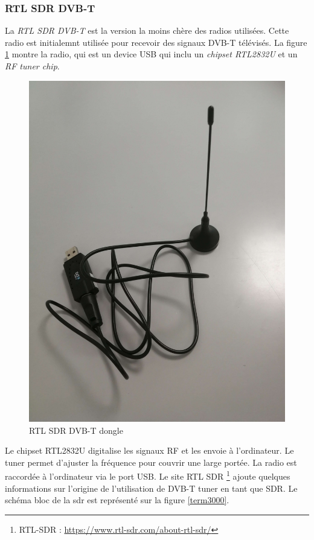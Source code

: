 \newpage

\subsubsection{RTL SDR DVB-T}\label{dvbt}

La \textit{RTL SDR DVB-T} est la version la moins chère des radios utilisées. Cette radio est initialemnt utilisée pour recevoir des signaux \ac{DVB-T} télévisés. La figure \ref{term31} montre la radio, qui est un device \ac{USB} qui inclu un \textit{chipset RTL2832U} et un \textit{RF tuner chip}.

\begin{figure}[h]
\centering

\includegraphics[scale=0.08]{images/dvbt.png}
\caption{RTL SDR DVB-T dongle}\label{term31}
\end{figure}

Le chipset RTL2832U digitalise les signaux RF et les envoie à l'ordinateur. Le tuner permet d'ajuster la fréquence pour couvrir une large portée.
La radio est raccordée à l'ordinateur via le port \ac{USB}. Le site RTL SDR \footnote{RTL-SDR : \href{https://www.rtl-sdr.com/about-rtl-sdr/}{https://www.rtl-sdr.com/about-rtl-sdr/}} ajoute quelques informations sur l'origine de l'utilisation de \ac{DVB-T} tuner en tant que \ac{SDR}. Le schéma bloc de la sdr est représenté sur la figure \ref{term3000}. 

